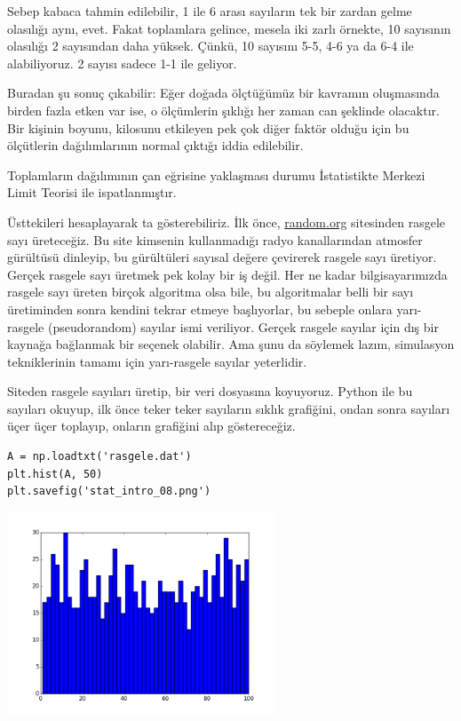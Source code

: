 \documentclass[12pt,fleqn]{article}\usepackage{../../common}
\begin{document}
Sebep kabaca tahmin edilebilir, 1 ile 6 arası sayıların tek bir zardan gelme
olasılığı aynı, evet. Fakat toplamlara gelince, mesela iki zarlı örnekte, 10
sayısının olasılığı 2 sayısından daha yüksek. Çünkü, 10 sayısını 5-5, 4-6 ya da
6-4 ile alabiliyoruz. 2 sayısı sadece 1-1 ile geliyor.

Buradan şu sonuç çıkabilir: Eğer doğada ölçtüğümüz bir kavramın oluşmasında
birden fazla etken var ise, o ölçümlerin şıklığı her zaman can şeklinde
olacaktır. Bir kişinin boyunu, kilosunu etkileyen pek çok diğer faktör
olduğu için bu ölçütlerin dağılımlarının normal çıktığı iddia edilebilir.

Toplamların dağılımının çan eğrisine yaklaşması durumu İstatistikte Merkezi
Limit Teorisi ile ispatlanmıştır. 

Üsttekileri hesaplayarak ta gösterebiliriz. İlk önce, \url{random.org}
sitesinden rasgele sayı üreteceğiz. Bu site kimsenin kullanmadığı radyo
kanallarından atmosfer gürültüsü dinleyip, bu gürültüleri sayısal değere
çevirerek rasgele sayı üretiyor. Gerçek rasgele sayı üretmek pek kolay bir
iş değil. Her ne kadar bilgisayarımızda rasgele sayı üreten birçok
algoritma olsa bile, bu algoritmalar belli bir sayı üretiminden sonra
kendini tekrar etmeye başlıyorlar, bu sebeple onlara yarı-rasgele
(pseudorandom) sayılar ismi veriliyor. Gerçek rasgele sayılar için dış bir
kaynağa bağlanmak bir seçenek olabilir. Ama şunu da söylemek lazım,
simulasyon tekniklerinin tamamı için yarı-rasgele sayılar yeterlidir.

Siteden rasgele sayıları üretip, bir veri dosyasına koyuyoruz. Python ile
bu sayıları okuyup, ilk önce teker teker sayıların sıklık grafiğini, ondan
sonra sayıları üçer üçer toplayıp, onların grafiğini alıp
göstereceğiz. 

\begin{verbatim}
A = np.loadtxt('rasgele.dat')
plt.hist(A, 50)
plt.savefig('stat_intro_08.png')
\end{verbatim}

\includegraphics[height=6cm]{stat_intro_08.png}
\end{document}
